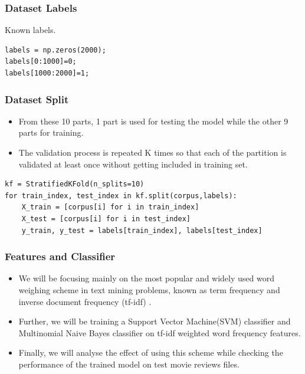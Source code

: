 \begin{frame}[fragile]\frametitle{Dataset Labels}
Known labels.
    \begin{lstlisting}
labels = np.zeros(2000);
labels[0:1000]=0;
labels[1000:2000]=1; 
    \end{lstlisting}
\end{frame}
        

\begin{frame}[fragile]\frametitle{Dataset Split}
   \begin{itemize}
  \item  From these 10 parts, 1 part is used for testing the model while the other 9 parts for training.
  \item The validation process is repeated K times so that each of the partition is validated at least once without getting included in training set.
    \end{itemize}
    \begin{lstlisting}
kf = StratifiedKFold(n_splits=10)
for train_index, test_index in kf.split(corpus,labels):
    X_train = [corpus[i] for i in train_index]
    X_test = [corpus[i] for i in test_index]
    y_train, y_test = labels[train_index], labels[test_index]
    \end{lstlisting}
\end{frame}

\begin{frame}[fragile]\frametitle{Features and Classifier}
  \begin{itemize}
  \item We will be focusing mainly on the most popular and widely used word weighing scheme in text mining problems, known as term frequency and inverse document frequency (tf-idf) . 
  \item Further, we will be training a Support Vector Machine(SVM) classifier and Multinomial Naive Bayes classifier on tf-idf weighted word frequency features. 
  \item Finally, we will analyse the effect of using this scheme while checking the performance of the trained model on test movie reviews files.
  \end{itemize}
\end{frame}

